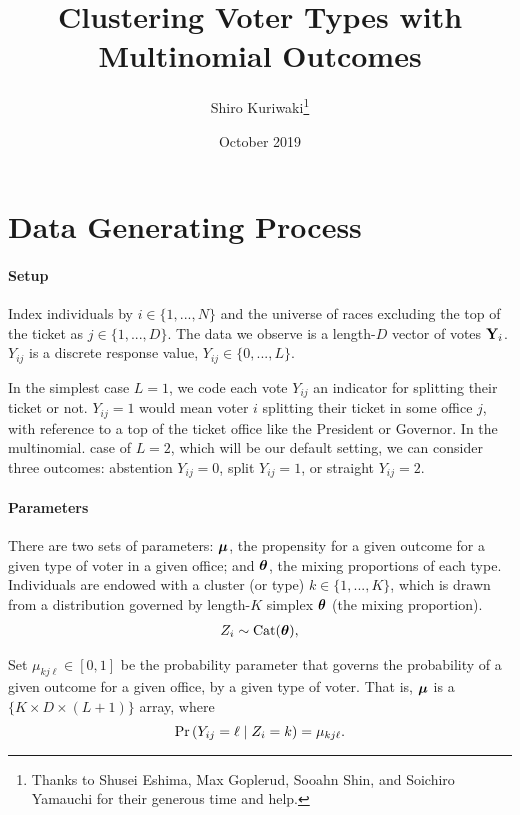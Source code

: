 \documentclass[11pt]{article}
\title{ \Large\textbf{Clustering Voter Types with Multinomial Outcomes}}
\author{\normalsize  Shiro Kuriwaki\thanks{Thanks to Shusei Eshima, Max Goplerud, Sooahn Shin, and Soichiro Yamauchi for their generous time and help.} }
\date{\normalsize October 2019}
\begin{document}
\maketitle

\onehalfspacing


\section{Data Generating Process}


\paragraph{Setup}

Index individuals by \(i \in \{1, ..., N\}\) and the universe of races
excluding the top of the ticket as \(j \in \{1, ..., D\}\). The data we
observe is a length-\(D\) vector of votes \(\mathbf{Y}_i\). \(Y_{ij}\) is a
discrete response value, \(Y_{ij} \in \{0, ..., L\}\). 

In the simplest case \(L = 1\), we code each vote \(Y_{ij}\) an indicator for splitting their ticket or not. \(Y_{ij} = 1\) would mean voter \(i\) splitting their ticket in some office \(j\), with reference to a top of the ticket office like the President or Governor. In the multinomial. case of \(L = 2\), which will be our default setting, we can consider three outcomes: abstention \(Y_{ij} = 0\), split \(Y_{ij} = 1\), or straight \(Y_{ij} = 2\).


\paragraph{Parameters}


There are two sets of parameters: \(\bm{\mu}\), the propensity for a given outcome for a given type of voter in a given office; and \(\bm{\theta}\), the mixing proportions of each type.  Individuals are endowed with a cluster (or type) \(k \in \{1, ..., K\}\), which is drawn from a distribution governed by length-\(K\) simplex \(\bm{\theta}\) (the mixing proportion).
\begin{align*}
Z_i \sim  \text{Cat}(\bm{\theta}),
\end{align*}

Set \(\mu_{kj\ell} \in [0, 1]\) be the probability parameter that governs the probability of a given outcome for a given office, by a given type of voter. That is, \(\bm{\mu}\) is a \(\{K \times D \times (L + 1)\}\) array, where 
 \[\mathbb{\Pr}\left(Y_{ij} = \ell \mid Z_i = k\right) = \mu_{kj\ell}.\]
\end{document}
